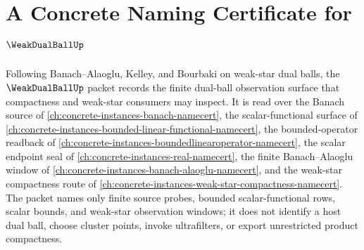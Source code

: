 \chapter{A Concrete Naming Certificate for $\WeakDualBallUp$}
\label{ch:concrete-instances-weak-dual-ball-namecert}

Following Banach--Alaoglu, Kelley, and Bourbaki on weak-star dual balls, the $\WeakDualBallUp$ packet records the finite dual-ball observation surface that compactness and weak-star consumers may inspect. It is read over the Banach source of \autoref{ch:concrete-instances-banach-namecert}, the scalar-functional surface of \autoref{ch:concrete-instances-bounded-linear-functional-namecert}, the bounded-operator readback of \autoref{ch:concrete-instances-boundedlinearoperator-namecert}, the scalar endpoint seal of \autoref{ch:concrete-instances-real-namecert}, the finite Banach--Alaoglu window of \autoref{ch:concrete-instances-banach-alaoglu-namecert}, and the weak-star compactness route of \autoref{ch:concrete-instances-weak-star-compactness-namecert}. The packet names only finite source probes, bounded scalar-functional rows, scalar bounds, and weak-star observation windows; it does not identify a host dual ball, choose cluster points, invoke ultrafilters, or export unrestricted product compactness.

